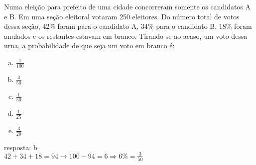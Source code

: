 \begin{ex}
 Numa eleição para prefeito de uma cidade concorreram somente os candidatos A e B. Em uma seção eleitoral votaram 250 eleitores. Do número total de votos dessa seção, 42\% foram para o candidato A, 34\% para o candidato B, 18\% foram anulados e os restantes estavam em branco. Tirando-se ao acaso, um voto dessa urna, a probabilidade de que seja um voto em branco é:
    \begin{enumerate}[(a)]
    \item $\frac{1}{100}$
    \item $\frac{3}{50}$
    \item $\frac{1}{50}$
    \item $\frac{1}{25}$
    \item $\frac{3}{20}$
    \end{enumerate}
      \begin{sol}
      resposta: b \\
       $ 42+34+18=94 \longrightarrow 100-94=6 \Longrightarrow 6\%=\frac{3}{50}$
       \end{sol}
\end{ex}
